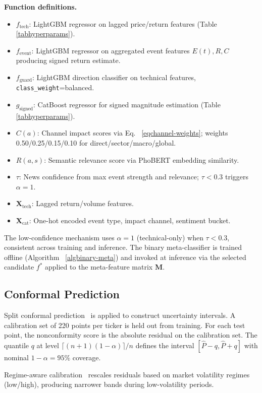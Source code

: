 \documentclass[runningheads]{llncs}
\begin{document}
\textbf{Function definitions.}
\begin{itemize}
\item $f_{\text{tech}}$: LightGBM regressor on lagged price/return features (Table~
\ref{tabhyperparams}).
\item $f_{\text{event}}$: LightGBM regressor on aggregated event features $E(t), R, C$ producing signed return estimate.
\item $f_{\text{guard}}$: LightGBM direction classifier on technical features, \texttt{class\_weight}=balanced.
\item $g_{\text{signed}}$: CatBoost regressor for signed magnitude estimation (Table~
\ref{tabhyperparams}).
\item $C(a)$: Channel impact scores via Eq.~
\ref{eqchannel-weights}; weights 0.50/0.25/0.15/0.10 for direct/sector/macro/global.
\item $R(a, s)$: Semantic relevance score via PhoBERT embedding similarity.
\item $\tau$: News confidence from max event strength and relevance; $\tau < 0.3$ triggers $\alpha=1$.
\item $\mathbf{X}_{\text{tech}}$: Lagged return/volume features.
\item $\mathbf{X}_{\text{cat}}$: One-hot encoded event type, impact channel, sentiment bucket.
\end{itemize}

The low-confidence mechanism uses $\alpha = 1$ (technical-only) when $\tau < 0.3$, consistent across training and inference. The binary meta-classifier is trained offline (Algorithm~
\ref{algbinary-meta}) and invoked at inference via the selected candidate $f^*$ applied to the meta-feature matrix $\mathbf{M}$.

\subsection{Conformal Prediction}
\label{secconformal}

Split conformal prediction~\cite{lei2018distribution} is applied to construct uncertainty intervals. A calibration set of 220 points per ticker is held out from training. For each test point, the nonconformity score is the absolute residual on the calibration set. The quantile $q$ at level $\lceil(n+1)(1-\alpha)\rceil/n$ defines the interval $[\widehat{P} - q, \widehat{P} + q]$ with nominal $1-\alpha = 95\%$ coverage.

Regime-aware calibration~\cite{hamilton1989regime} rescales residuals based on market volatility regimes (low/high), producing narrower bands during low-volatility periods.
\end{document}
